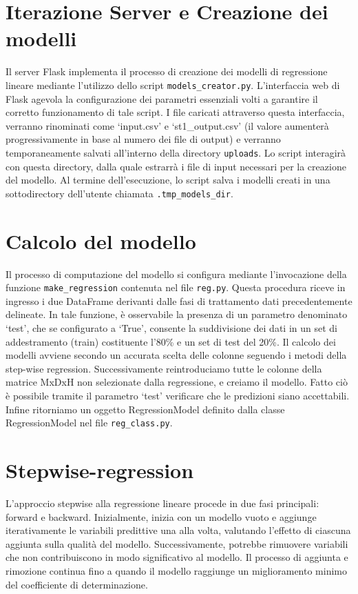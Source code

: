 \documentclass{rapportECL}
\begin{document}
\section{Iterazione Server e Creazione dei modelli}

Il server Flask implementa il processo di creazione dei modelli di regressione lineare mediante l'utilizzo dello script \texttt{models\_creator.py}. 
L'interfaccia web di Flask agevola la configurazione dei parametri essenziali volti a garantire il corretto funzionamento di tale script. 
I file caricati attraverso questa interfaccia, verranno rinominati come `input.csv' e `st1\_output.csv' (il valore aumenterà progressivamente in base al numero dei file di output)
e verranno temporaneamente salvati all'interno della directory \texttt{uploads}.
Lo script interagirà con questa directory, dalla quale estrarrà i file di input necessari per la creazione del modello.
Al termine dell'esecuzione, lo script salva i modelli creati in una sottodirectory dell'utente chiamata \texttt{.tmp\_models\_dir}.

\section{Calcolo del modello}
Il processo di computazione del modello si configura mediante l'invocazione della funzione \texttt{make\_regression} contenuta nel file \texttt{reg.py}. 
Questa procedura riceve in ingresso i due DataFrame derivanti dalle fasi di trattamento dati precedentemente delineate. 
In tale funzione, è osservabile la presenza di un parametro denominato `test', che se configurato a `True', 
consente la suddivisione dei dati in un set di addestramento (train) costituente l'80\% e un set di test del 20\%.  Il calcolo dei modelli
avviene secondo un accurata scelta delle colonne seguendo i metodi della step-wise regression. 
Successivamente reintroduciamo tutte le colonne della matrice MxDxH non selezionate dalla regressione, e creiamo il modello. 
Fatto ciò è possibile tramite il parametro `test' verificare che le predizioni siano accettabili. Infine ritorniamo un oggetto RegressionModel definito 
dalla classe RegressionModel nel file \texttt{reg\_class.py}.

\section{Stepwise-regression}
L'approccio stepwise alla regressione lineare procede in due fasi principali: forward e backward. Inizialmente, inizia con un modello vuoto e 
aggiunge iterativamente le variabili predittive una alla volta, valutando l'effetto di ciascuna aggiunta sulla qualità del modello. 
Successivamente, potrebbe rimuovere variabili che non contribuiscono in modo significativo al modello.
Il processo di aggiunta e rimozione continua fino a quando il modello raggiunge un miglioramento minimo del coefficiente di determinazione.
\end{document}
